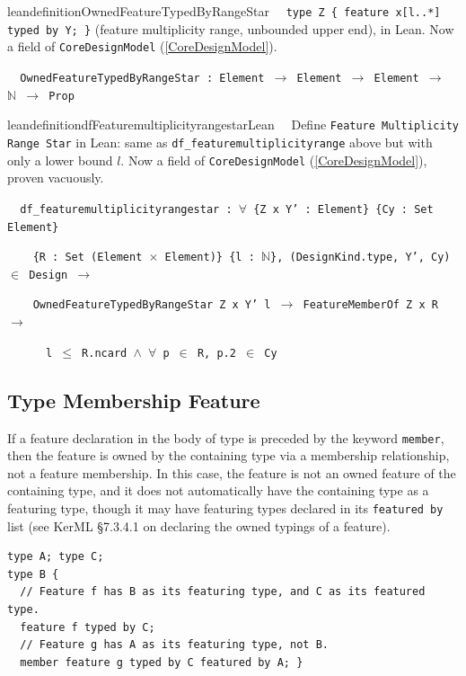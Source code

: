 \begin{restatable}{leandefinition}{OwnedFeatureTypedByRangeStar}~~
\texttt{type Z \{ feature x[l..*] typed by Y; \}} (feature multiplicity range, unbounded upper end), in Lean.
Now a field of \texttt{CoreDesignModel} (\ref{CoreDesignModel}).

\texttt{~~OwnedFeatureTypedByRangeStar : Element $\to$ Element $\to$ Element $\to$ $\mathbb{N}$ $\to$ Prop}
\label{OwnedFeatureTypedByRangeStar}
\end{restatable}

\begin{restatable}{leandefinition}{dfFeaturemultiplicityrangestarLean}~~
Define \texttt{Feature Multiplicity Range Star} in Lean: same as \texttt{df\_featuremultiplicityrange} above
but with only a lower bound $l$. Now a field of \texttt{CoreDesignModel} (\ref{CoreDesignModel}), proven
vacuously.

\texttt{~~df\_featuremultiplicityrangestar : $\forall$ \{Z x Y' : Element\} \{Cy : Set Element\}}

\texttt{~~~~\{R : Set (Element $\times$ Element)\} \{l : $\mathbb{N}$\}, (DesignKind.type, Y', Cy) $\in$ Design $\to$}

\texttt{~~~~OwnedFeatureTypedByRangeStar Z x Y' l $\to$ FeatureMemberOf Z x R $\to$}

\texttt{~~~~~~l $\le$ R.ncard $\wedge$ $\forall$ p $\in$ R, p.2 $\in$ Cy}
\label{df_featuremultiplicityrangestar}
\end{restatable}

\subsection{Type Membership Feature}

\pn If a feature declaration in the body of type is preceded by the keyword \texttt{member}, then the feature is owned by the containing type via a membership relationship, not a feature membership. In this case, the feature is not an owned feature of the containing type, and it does not automatically have the containing type as a featuring type, though it may have featuring types declared in its \texttt{featured by} list 
(see KerML \S7.3.4.1 on declaring the owned typings of a feature).

\begin{lstlisting}
type A; type C;
type B {
  // Feature f has B as its featuring type, and C as its featured type. 
  feature f typed by C;
  // Feature g has A as its featuring type, not B.
  member feature g typed by C featured by A; }
\end{lstlisting}

